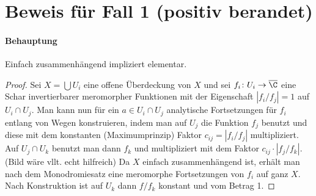 \documentclass{article}
\begin{document}
        \section{Beweis für Fall 1 (positiv berandet)}
        \paragraph{Behauptung} Einfach zusammenhängend impliziert elementar.
        \begin{proof}
            Sei $X = \bigcup U_i$ eine offene Überdeckung von $X$ und sei $f_i\colon U_i \to \overline{\C}$ eine Schar invertierbarer meromorpher Funktionen mit der Eigenschaft $|f_i/f_j| = 1$ auf $U_i \cap U_j$.
            Man kann nun für ein $a \in U_i \cap U_j$ analytische Fortsetzungen für $f_i$ entlang von Wegen konstruieren, indem man auf $U_j$ die Funktion $f_j$ benutzt und diese mit dem konstanten (Maximumprinzip) Faktor $c_{ij} = |f_i/f_j|$ multipliziert. Auf $U_j \cap U_k$ benutzt man dann $f_k$ und multipliziert mit dem Faktor $c_{ij} \cdot |f_j/f_k|$. (Bild wäre vllt. echt hilfreich)
            Da $X$ einfach zusammenhängend ist, erhält man nach dem Monodromiesatz eine meromorphe Fortsetzungen von $f_i$ auf ganz $X$. Nach Konstruktion ist auf $U_k$ dann $f/f_k$ konstant und vom Betrag 1.
        \end{proof}
\end{document}
